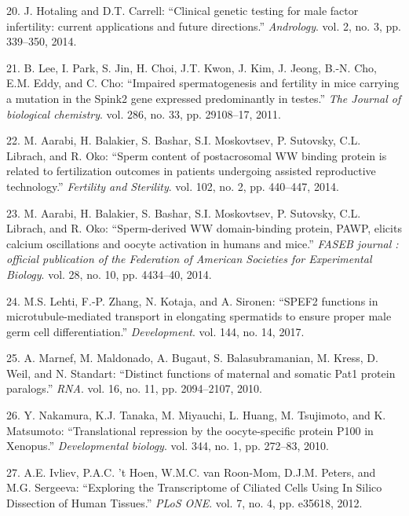 \documentclass[12pt,twoside]{ugathesis}
\begin{document}
\hypertarget{ref-Hotaling2014}{}
20. J. Hotaling and D.T. Carrell: ``Clinical genetic testing for male
factor infertility: current applications and future directions.''
\emph{Andrology}. vol. 2, no. 3, pp. 339--350, 2014.

\hypertarget{ref-Lee2011}{}
21. B. Lee, I. Park, S. Jin, H. Choi, J.T. Kwon, J. Kim, J. Jeong, B.-N.
Cho, E.M. Eddy, and C. Cho: ``Impaired spermatogenesis and fertility in
mice carrying a mutation in the Spink2 gene expressed predominantly in
testes.'' \emph{The Journal of biological chemistry}. vol. 286, no. 33,
pp. 29108--17, 2011.

\hypertarget{ref-Aarabi2014}{}
22. M. Aarabi, H. Balakier, S. Bashar, S.I. Moskovtsev, P. Sutovsky,
C.L. Librach, and R. Oko: ``Sperm content of postacrosomal WW binding
protein is related to fertilization outcomes in patients undergoing
assisted reproductive technology.'' \emph{Fertility and Sterility}. vol.
102, no. 2, pp. 440--447, 2014.

\hypertarget{ref-Aarabi2014a}{}
23. M. Aarabi, H. Balakier, S. Bashar, S.I. Moskovtsev, P. Sutovsky,
C.L. Librach, and R. Oko: ``Sperm-derived WW domain-binding protein,
PAWP, elicits calcium oscillations and oocyte activation in humans and
mice.'' \emph{FASEB journal : official publication of the Federation of
American Societies for Experimental Biology}. vol. 28, no. 10, pp.
4434--40, 2014.

\hypertarget{ref-Lehti2017}{}
24. M.S. Lehti, F.-P. Zhang, N. Kotaja, and A. Sironen: ``SPEF2
functions in microtubule-mediated transport in elongating spermatids to
ensure proper male germ cell differentiation.'' \emph{Development}. vol.
144, no. 14, 2017.

\hypertarget{ref-Marnef2010}{}
25. A. Marnef, M. Maldonado, A. Bugaut, S. Balasubramanian, M. Kress, D.
Weil, and N. Standart: ``Distinct functions of maternal and somatic Pat1
protein paralogs.'' \emph{RNA}. vol. 16, no. 11, pp. 2094--2107, 2010.

\hypertarget{ref-Nakamura2010}{}
26. Y. Nakamura, K.J. Tanaka, M. Miyauchi, L. Huang, M. Tsujimoto, and
K. Matsumoto: ``Translational repression by the oocyte-specific protein
P100 in Xenopus.'' \emph{Developmental biology}. vol. 344, no. 1, pp.
272--83, 2010.

\hypertarget{ref-Ivliev2012}{}
27. A.E. Ivliev, P.A.C. 't Hoen, W.M.C. van Roon-Mom, D.J.M. Peters, and
M.G. Sergeeva: ``Exploring the Transcriptome of Ciliated Cells Using In
Silico Dissection of Human Tissues.'' \emph{PLoS ONE}. vol. 7, no. 4,
pp. e35618, 2012.
\end{document}
